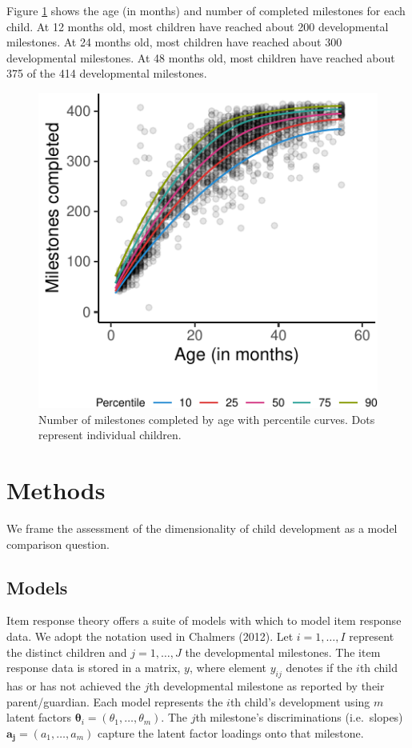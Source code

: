 \documentclass[10pt, letterpaper]{article}
\newenvironment{CodeChunk}{}{}
\begin{document}
Figure \ref{fig:growth} shows the age (in months) and number of
completed milestones for each child. At 12 months old, most children
have reached about 200 developmental milestones. At 24 months old, most
children have reached about 300 developmental milestones. At 48 months
old, most children have reached about 375 of the 414 developmental
milestones.

\begin{CodeChunk}
\begin{figure}[tb]
\includegraphics{figs/growth-1} \caption[Number of milestones completed by age with percentile curves]{Number of milestones completed by age with percentile curves. Dots represent individual children.}\label{fig:growth}
\end{figure}
\end{CodeChunk}

\hypertarget{methods}{%
\section{Methods}\label{methods}}

We frame the assessment of the dimensionality of child development as a
model comparison question.

\hypertarget{models}{%
\subsection{Models}\label{models}}

Item response theory offers a suite of models with which to model item
response data. We adopt the notation used in Chalmers (2012). Let
\(i = 1, \ldots, I\) represent the distinct children and
\(j = 1, \ldots, J\) the developmental milestones. The item response
data is stored in a matrix, \(y\), where element \(y_{ij}\) denotes if
the \(i\)th child has or has not achieved the \(j\)th developmental
milestone as reported by their parent/guardian. Each model represents
the \(i\)th child's development using \(m\) latent factors
\(\boldsymbol{\theta}_{i}=(\theta_1, \dots, \theta_m)\). The \(j\)th
milestone's discriminations (i.e.~slopes)
\(\boldsymbol{a_j}=(a_1, \dots, a_m)\) capture the latent factor
loadings onto that milestone.
\end{document}
